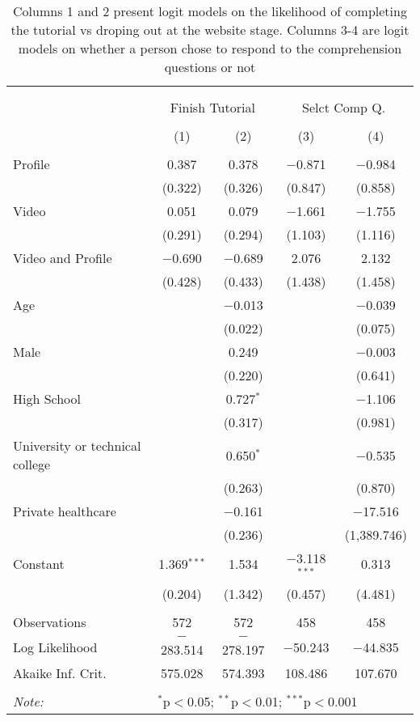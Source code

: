 
\begin{table}[H] \centering 
  \caption{Columns 1 and 2 present logit models on the likelihood of completing the tutorial vs droping out at the website stage. Columns 3-4 are logit models on whether a 
          person chose to respond to the comprehension questions or not} 
  \label{tbl:Main_results_correct_response} 
\begin{tabular}{@{\extracolsep{5pt}}lcccc} 
\\[-1.8ex]\hline 
\hline \\[-1.8ex] 
\\[-1.8ex] & \multicolumn{2}{c}{Finish Tutorial} & \multicolumn{2}{c}{Selct Comp Q.} \\ 
\\[-1.8ex] & (1) & (2) & (3) & (4)\\ 
\hline \\[-1.8ex] 
 Profile & 0.387 & 0.378 & $-$0.871 & $-$0.984 \\ 
  & (0.322) & (0.326) & (0.847) & (0.858) \\ 
  Video & 0.051 & 0.079 & $-$1.661 & $-$1.755 \\ 
  & (0.291) & (0.294) & (1.103) & (1.116) \\ 
  Video and Profile & $-$0.690 & $-$0.689 & 2.076 & 2.132 \\ 
  & (0.428) & (0.433) & (1.438) & (1.458) \\ 
  Age &  & $-$0.013 &  & $-$0.039 \\ 
  &  & (0.022) &  & (0.075) \\ 
  Male &  & 0.249 &  & $-$0.003 \\ 
  &  & (0.220) &  & (0.641) \\ 
  High School &  & 0.727$^{*}$ &  & $-$1.106 \\ 
  &  & (0.317) &  & (0.981) \\ 
  University or technical college &  & 0.650$^{*}$ &  & $-$0.535 \\ 
  &  & (0.263) &  & (0.870) \\ 
  Private healthcare &  & $-$0.161 &  & $-$17.516 \\ 
  &  & (0.236) &  & (1,389.746) \\ 
  Constant & 1.369$^{***}$ & 1.534 & $-$3.118$^{***}$ & 0.313 \\ 
  & (0.204) & (1.342) & (0.457) & (4.481) \\ 
 \hline \\[-1.8ex] 
Observations & 572 & 572 & 458 & 458 \\ 
Log Likelihood & $-$283.514 & $-$278.197 & $-$50.243 & $-$44.835 \\ 
Akaike Inf. Crit. & 575.028 & 574.393 & 108.486 & 107.670 \\ 
\hline 
\hline \\[-1.8ex] 
\textit{Note:}  & \multicolumn{4}{l}{$^{*}$p$<$0.05; $^{**}$p$<$0.01; $^{***}$p$<$0.001} \\ 
\end{tabular} 
\end{table} 
